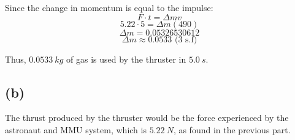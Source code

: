 \documentclass[11pt]{article}
\begin{document}
Since the change in momentum is equal to the impulse:
\[F \cdot t = \Delta mv\]
\[5.22 \cdot 5 = \Delta m(490)\]
\[\Delta m = 0.05326530612\]
\[\Delta m \approx 0.0533 \text{ (3 s.f)}\]

Thus, \(\qty{0.0533}{\unit{kg}}\) of gas is used by the thruster in \(\qty{5.0}{\unit{s}}\).

\subsection{(b)}
\label{sec:org94ee3a0}

The thrust produced by the thruster would be the force experienced by the astronaut and MMU system, which is \(\qty{5.22}{\unit{N}}\), as found in the previous part.
\end{document}
